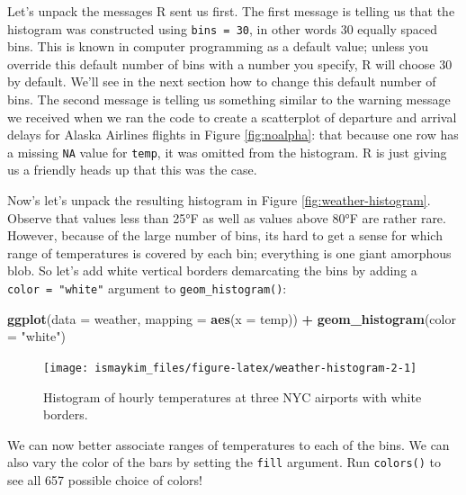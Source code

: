 \documentclass[12pt, krantz2,]{krantz}
\makeatletter
\newenvironment{Shaded}{\begin{snugshade}}{\end{snugshade}}
\newcommand{\DataTypeTok}[1]{\textcolor[rgb]{0.27,0.27,0.27}{#1}}
\newcommand{\KeywordTok}[1]{\textcolor[rgb]{0.27,0.27,0.27}{\textbf{#1}}}
\newcommand{\NormalTok}[1]{#1}
\newcommand{\OperatorTok}[1]{\textcolor[rgb]{0.43,0.43,0.43}{\textbf{#1}}}
\newcommand{\StringTok}[1]{\textcolor[rgb]{0.5,0.5,0.5}{#1}}
\newenvironment{kframe}{%
\medskip{}
\setlength{\fboxsep}{.8em}
 \def\at@end@of@kframe{}%
 \ifinner\ifhmode%
  \def\at@end@of@kframe{\end{minipage}}%
  \begin{minipage}{\columnwidth}%
 \fi\fi%
 \def\FrameCommand##1{\hskip\@totalleftmargin \hskip-\fboxsep
 \colorbox{shadecolor}{##1}\hskip-\fboxsep
     \hskip-\linewidth \hskip-\@totalleftmargin \hskip\columnwidth}%
 \MakeFramed {\advance\hsize-\width
   \@totalleftmargin\z@ \linewidth\hsize
   \@setminipage}}%
 {\par\unskip\endMakeFramed%
 \at@end@of@kframe}
\renewenvironment{Shaded}{\begin{kframe}}{\end{kframe}}
\makeatother
\begin{document}
Let's unpack the messages R sent us first. The first message is telling us that the histogram was constructed using \texttt{bins\ =\ 30}, in other words 30 equally spaced bins. This is known in computer programming as a default value; unless you override this default number of bins with a number you specify, R will choose 30 by default. We'll see in the next section how to change this default number of bins. The second message is telling us something similar to the warning message we received when we ran the code to create a scatterplot of departure and arrival delays for Alaska Airlines flights in Figure \ref{fig:noalpha}: that because one row has a missing \texttt{NA} value for \texttt{temp}, it was omitted from the histogram. R is just giving us a friendly heads up that this was the case.

Now's let's unpack the resulting histogram in Figure \ref{fig:weather-histogram}. Observe that values less than 25°F as well as values above 80°F are rather rare. However, because of the large number of bins, its hard to get a sense for which range of temperatures is covered by each bin; everything is one giant amorphous blob. So let's add white vertical borders demarcating the bins by adding a \texttt{color\ =\ "white"} argument to \texttt{geom\_histogram()}:

\begin{Shaded}
\begin{Highlighting}[]
\KeywordTok{ggplot}\NormalTok{(}\DataTypeTok{data =}\NormalTok{ weather, }\DataTypeTok{mapping =} \KeywordTok{aes}\NormalTok{(}\DataTypeTok{x =}\NormalTok{ temp)) }\OperatorTok{+}
\StringTok{  }\KeywordTok{geom_histogram}\NormalTok{(}\DataTypeTok{color =} \StringTok{"white"}\NormalTok{)}
\end{Highlighting}
\end{Shaded}

\begin{figure}

{\centering \texttt{[image: ismaykim\_files/figure-latex/weather-histogram-2-1]} 

}

\caption{Histogram of hourly temperatures at three NYC airports with white borders.}\label{fig:weather-histogram-2}
\end{figure}

We can now better associate ranges of temperatures to each of the bins. We can also vary the color of the bars by setting the \texttt{fill} argument. Run \texttt{colors()} to see all 657 possible choice of colors!
\end{document}
